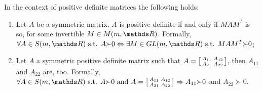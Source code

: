 \documentclass[ComputationalMathematics.tex]{subfiles}
\begin{document}
\begin{lemma}\label{lemma:23nov1}
  In the context of positive definite matrices the following holds:
\begin{enumerate}
  \item Let $A$ be a symmetric matrix. $A$ is positive definite if and only if $MAM^T$ is so, for some invertible $M \in M(m, \R)$.
    Formally, $\forall A \in S(m, \R) \text{ s.t. } A{\succ} 0 \Leftrightarrow \exists M \in GL(m, \R) \text{ s.t. } MA\tr{M} {\succ} 0$;
	\item Let $A$ a symmetric positive definite matrix such that $A = \begin{bsmallmatrix}
	    A_{11} & A_{12}\\
	    A_{21} & A_{22}
  \end{bsmallmatrix}$, then $A_{11}$ and $A_{22}$ are, too.
    Formally, $\forall A \in S(m, \R) \text{ s.t. } A {\succ} 0 \text{ and } A = \begin{bsmallmatrix}
	    A_{11} & A_{12}\\
	    A_{21} & A_{22}
    \end{bsmallmatrix} \Rightarrow A_{11} {\succ} 0$ and $A_{22} {\succ} 0$.
\end{enumerate}
\end{lemma}
\end{document}
